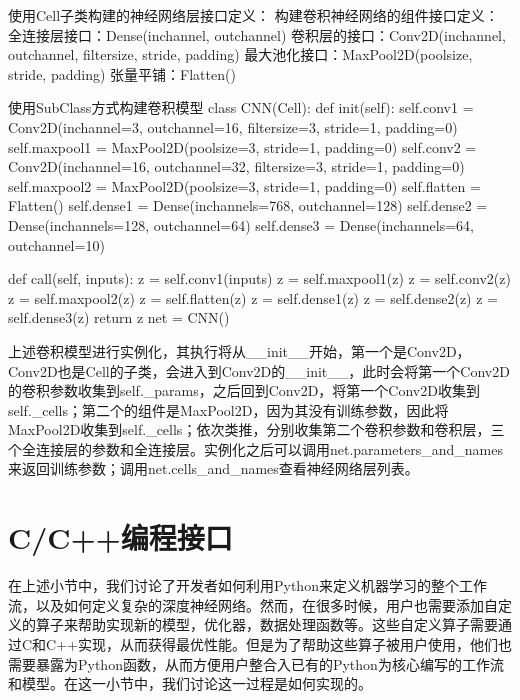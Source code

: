 \documentclass[letterpaper,10pt,english]{sphinxmanual}
\begin{document}
\begin{sphinxVerbatim}[commandchars=\\\{\}]
\PYGZsh{} 使用Cell子类构建的神经网络层接口定义：
\PYGZsh{} 构建卷积神经网络的组件接口定义：
全连接层接口：Dense(in\PYGZus{}channel, out\PYGZus{}channel)
卷积层的接口：Conv2D(in\PYGZus{}channel, out\PYGZus{}channel, filter\PYGZus{}size, stride, padding)
最大池化接口：MaxPool2D(pool\PYGZus{}size, stride, padding)
张量平铺：Flatten()

\PYGZsh{} 使用SubClass方式构建卷积模型
class CNN(Cell):
    def \PYGZus{}\PYGZus{}init\PYGZus{}\PYGZus{}(self):
        self.conv1 = Conv2D(in\PYGZus{}channel=3, out\PYGZus{}channel=16, filter\PYGZus{}size=3, stride=1, padding=0)
        self.maxpool1 = MaxPool2D(pool\PYGZus{}size=3, stride=1, padding=0)
        self.conv2 = Conv2D(in\PYGZus{}channel=16, out\PYGZus{}channel=32, filter\PYGZus{}size=3, stride=1, padding=0)
        self.maxpool2 = MaxPool2D(pool\PYGZus{}size=3, stride=1, padding=0)
        self.flatten = Flatten()
        self.dense1 = Dense(in\PYGZus{}channels=768, out\PYGZus{}channel=128)
        self.dense2 = Dense(in\PYGZus{}channels=128, out\PYGZus{}channel=64)
        self.dense3 = Dense(in\PYGZus{}channels=64, out\PYGZus{}channel=10)

    def \PYGZus{}\PYGZus{}call\PYGZus{}\PYGZus{}(self, inputs):
        z = self.conv1(inputs)
        z = self.maxpool1(z)
        z = self.conv2(z)
        z = self.maxpool2(z)
        z = self.flatten(z)
        z = self.dense1(z)
        z = self.dense2(z)
        z = self.dense3(z)
        return z
net = CNN()
\end{sphinxVerbatim}

\sphinxAtStartPar
上述卷积模型进行实例化，其执行将从\_\_init\_\_开始，第一个是Conv2D，Conv2D也是Cell的子类，会进入到Conv2D的\_\_init\_\_，此时会将第一个Conv2D的卷积参数收集到self.\_params，之后回到Conv2D，将第一个Conv2D收集到self.\_cells；第二个的组件是MaxPool2D，因为其没有训练参数，因此将MaxPool2D收集到self.\_cells；依次类推，分别收集第二个卷积参数和卷积层，三个全连接层的参数和全连接层。实例化之后可以调用net.parameters\_and\_names来返回训练参数；调用net.cells\_and\_names查看神经网络层列表。


\section{C/C++编程接口}
\label{\detokenize{chapter_programming_interface/c_python_interaction:c-c}}\label{\detokenize{chapter_programming_interface/c_python_interaction::doc}}
\sphinxAtStartPar
在上述小节中，我们讨论了开发者如何利用Python来定义机器学习的整个工作流，以及如何定义复杂的深度神经网络。然而，在很多时候，用户也需要添加自定义的算子来帮助实现新的模型，优化器，数据处理函数等。这些自定义算子需要通过C和C++实现，从而获得最优性能。但是为了帮助这些算子被用户使用，他们也需要暴露为Python函数，从而方便用户整合入已有的Python为核心编写的工作流和模型。在这一小节中，我们讨论这一过程是如何实现的。
\end{document}
